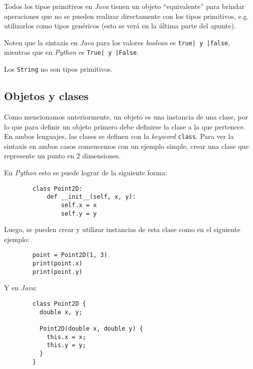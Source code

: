     Todos los tipos primitivos en \textit{Java} tienen un objeto \enquote{equivalente} 
    para brindar operaciones que no se pueden realizar directamente con los tipos 
    primitivos, e.g. utilizarlos como tipos genéricos (esto se verá en la última parte del 
    apunte).

    Noten que la sintaxis en \textit{Java} para los valores \textit{boolean} es 
    \texttt{true| y |false}, mientras que en \textit{Python} es 
    \texttt{True| y |False}.

    \begin{important}
      Los \texttt{String} no son tipos primitivos.
    \end{important}

  \subsection{Objetos y clases}
    Como mencionamos anteriormente, un objeto es una instancia de una clase, por lo que para
    definir un objeto primero debe definirse la clase a la que pertenece.
    En ambos lenguajes, las clases se definen con la \textit{keyword} 
    \texttt{class}.
    Para ver la sintaxis en ambos casos comencemos con un ejemplo simple, crear una clase 
    que represente un punto en 2 dimensiones.

    En \textit{Python} esto se puede lograr de la siguiente forma:

    \begin{listing}[ht!]
      \begin{verbatim}
        class Point2D:
            def __init__(self, x, y):
                self.x = x
                self.y = y
      \end{verbatim}
    \end{listing}

    Luego, se pueden crear y utilizar instancias de esta clase como en el siguiente 
    ejemplo:

    \begin{listing}[ht!]
      \begin{verbatim}
        point = Point2D(1, 3)
        print(point.x)
        print(point.y)
      \end{verbatim}
    \end{listing}

    Y en \textit{Java}:
    \begin{listing}[ht!]
      \begin{verbatim}
        class Point2D {
          double x, y;

          Point2D(double x, double y) {
            this.x = x;
            this.y = y;
          }
        }
      \end{verbatim}
    \end{listing}

